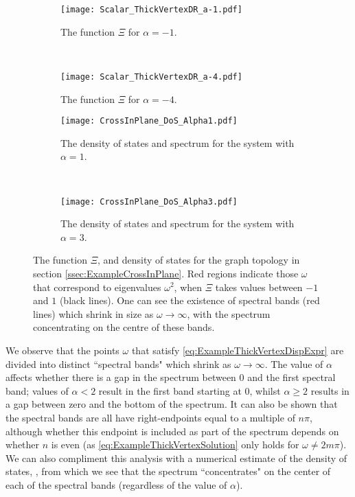 \begin{figure}[t!]
	\centering
	\begin{subfigure}[t]{0.45\textwidth}
		\centering
		\texttt{[image: Scalar\_ThickVertexDR\_a-1.pdf]}
		\caption{\label{fig:Scalar_ThickVertexDR_a-1} The function $\Xi$ for $\alpha=-1$.}
	\end{subfigure}
	~
	\begin{subfigure}[t]{0.45\textwidth}
		\centering
		\texttt{[image: Scalar\_ThickVertexDR\_a-4.pdf]}
		\caption{\label{fig:Scalar_ThickVertexDR_a-4} The function $\Xi$ for $\alpha=-4$.}
	\end{subfigure}
	\newline
	\begin{subfigure}[t]{0.45\textwidth}
		\centering
		\texttt{[image: CrossInPlane\_DoS\_Alpha1.pdf]}
		\caption{\label{fig:CrossInPlane_DoS_Alpha1} The density of states and spectrum for the system with $\alpha=1$.}
	\end{subfigure}
	~
	\begin{subfigure}[t]{0.45\textwidth}
		\centering
		\texttt{[image: CrossInPlane\_DoS\_Alpha3.pdf]}
		\caption{\label{fig:CrossInPlane_DoS_Alpha3} The density of states and spectrum for the system with $\alpha=3$.}
	\end{subfigure}	
	\caption{\label{fig:Scalar_ThickVertexAllResults} The function $\Xi$, and density of states for the graph topology in section \ref{ssec:ExampleCrossInPlane}.
	Red regions indicate those $\omega$ that correspond to eigenvalues $\omega^2$, when $\Xi$ takes values between $-1$ and $1$ (black lines).
	One can see the existence of spectral bands (red lines) which shrink in size as $\omega\rightarrow\infty$, with the spectrum concentrating on the centre of these bands.}
\end{figure}
We observe that the points $\omega$ that satisfy \eqref{eq:ExampleThickVertexDispExpr} are divided into distinct ``spectral bands" which shrink as $\omega\rightarrow\infty$.
The value of $\alpha$ affects whether there is a gap in the spectrum between 0 and the first spectral band; values of $\alpha<2$ result in the first band starting at 0, whilst $\alpha\geq 2$ results in a gap between zero and the bottom of the spectrum.
It can also be shown that the spectral bands are all have right-endpoints equal to a multiple of $n\pi$, although whether this endpoint is included as part of the spectrum depends on whether $n$ is even (as \eqref{eq:ExampleThickVertexSolution} only holds for $\omega\neq 2m\pi$).
We can also compliment this analysis with a numerical estimate of the density of states, , from which we see that the spectrum ``concentrates" on the center of each of the spectral bands (regardless of the value of $\alpha$).
